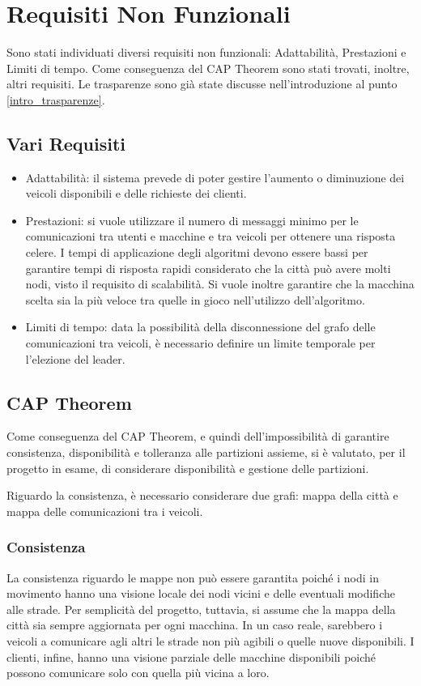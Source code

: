 \section{Requisiti Non Funzionali} \label{requisiti_non_funzionali}
Sono stati individuati diversi requisiti non funzionali: Adattabilità, Prestazioni e Limiti di tempo. Come conseguenza del CAP Theorem sono stati trovati, inoltre, altri requisiti.
Le trasparenze sono già state discusse nell'introduzione al punto \ref{intro_trasparenze}.

\subsection{Vari Requisiti}
\begin{itemize}
	\item Adattabilità: il sistema prevede di poter gestire l'aumento o diminuzione dei veicoli disponibili e delle richieste dei clienti.
	\item Prestazioni: si vuole utilizzare il numero di messaggi minimo per le comunicazioni tra utenti e macchine e tra veicoli per ottenere una risposta celere. I tempi di applicazione degli algoritmi devono essere bassi per garantire tempi di risposta rapidi considerato che la città può avere molti nodi, visto il requisito di scalabilità. Si vuole inoltre garantire che la macchina scelta sia la più veloce tra quelle in gioco nell'utilizzo dell'algoritmo.
	\item Limiti di tempo: data la possibilità della disconnessione del grafo delle comunicazioni tra veicoli, è necessario definire un limite temporale per l'elezione del leader.
\end{itemize}

\subsection{CAP Theorem}
Come conseguenza del CAP Theorem, e quindi dell'impossibilità di garantire consistenza, disponibilità e tolleranza alle partizioni assieme, si è valutato, per il progetto in esame, di considerare disponibilità e gestione delle partizioni.

Riguardo la consistenza, è necessario considerare due grafi: mappa della città e mappa delle comunicazioni tra i veicoli. 

\subsubsection{Consistenza}
La consistenza riguardo le mappe non può essere garantita poiché i nodi in movimento hanno una visione locale dei nodi vicini e delle eventuali modifiche alle strade. Per semplicità del progetto, tuttavia, si assume che la mappa della città sia sempre aggiornata per ogni macchina. In un caso reale, sarebbero i veicoli a comunicare agli altri le strade non più agibili o quelle nuove disponibili. I clienti, infine, hanno una visione parziale delle macchine disponibili poiché possono comunicare solo con quella più vicina a loro.

